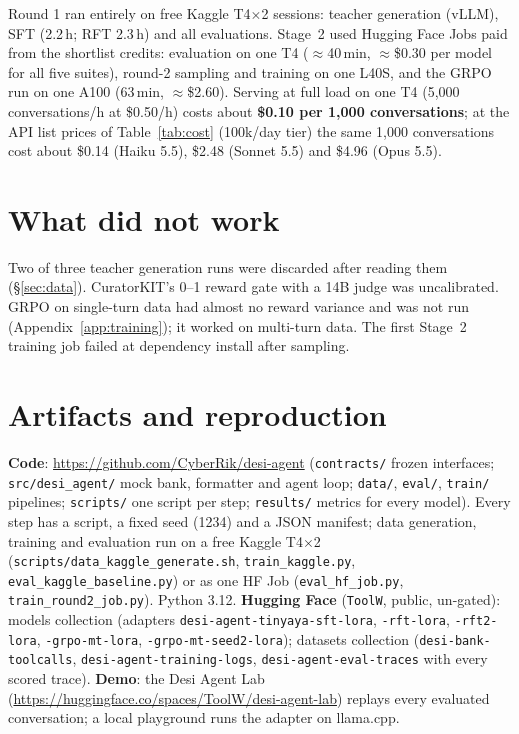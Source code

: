 \documentclass[11pt]{article}
\begin{document}
Round 1 ran entirely on free Kaggle T4$\times$2 sessions: teacher generation (vLLM), SFT (2.2\,h; RFT 2.3\,h) and all
evaluations. Stage~2 used Hugging Face Jobs paid from the shortlist credits: evaluation on one T4 ($\approx$40\,min,
$\approx$\$0.30 per model for all five suites), round-2 sampling and training on one L40S, and the GRPO run on one
A100 (63\,min, $\approx$\$2.60). Serving at full load on
one T4 (5,000 conversations/h at \$0.50/h) costs about \textbf{\$0.10 per 1,000 conversations}; at the API list prices
of Table~\ref{tab:cost} (100k/day tier) the same 1,000 conversations cost about \$0.14 (Haiku 5.5), \$2.48 (Sonnet 5.5) and
\$4.96 (Opus 5.5).

\section{What did not work}

Two of three teacher generation runs were discarded after reading them (\S\ref{sec:data}). CuratorKIT's 0--1 reward
gate with a 14B judge was uncalibrated. GRPO on single-turn data had almost no reward variance and was not run
(Appendix~\ref{app:training}); it worked on multi-turn data. The first Stage~2 training job failed at dependency install after sampling.

\section{Artifacts and reproduction}

\textbf{Code}: \url{https://github.com/CyberRik/desi-agent} (\texttt{contracts/} frozen interfaces;
\texttt{src/desi\_agent/} mock bank, formatter and agent loop; \texttt{data/}, \texttt{eval/}, \texttt{train/}
pipelines; \texttt{scripts/} one script per step; \texttt{results/} metrics for every model). Every step has a
script, a fixed seed (1234) and a JSON manifest; data generation, training and evaluation run on a free Kaggle
T4$\times$2 (\texttt{scripts/data\_kaggle\_generate.sh}, \texttt{train\_kaggle.py}, \texttt{eval\_kaggle\_baseline.py})
or as one HF Job (\texttt{eval\_hf\_job.py}, \texttt{train\_round2\_job.py}). Python 3.12.
\textbf{Hugging Face} (\texttt{ToolW}, public, un-gated): models collection (adapters \texttt{desi-agent-tinyaya-sft-lora},
\texttt{-rft-lora}, \texttt{-rft2-lora}, \texttt{-grpo-mt-lora}, \texttt{-grpo-mt-seed2-lora}); datasets collection (\texttt{desi-bank-toolcalls},
\texttt{desi-agent-training-logs}, \texttt{desi-agent-eval-traces} with every scored trace).
\textbf{Demo}: the Desi Agent Lab (\url{https://huggingface.co/spaces/ToolW/desi-agent-lab}) replays every evaluated
conversation; a local playground runs the adapter on llama.cpp.
\end{document}
